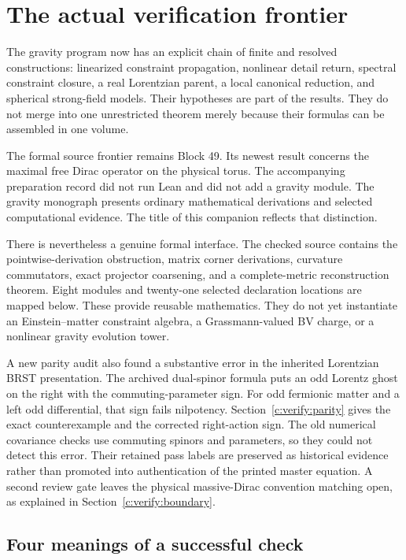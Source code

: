 \section{The actual verification frontier}\label{c:verify:frontier}

The gravity program now has an explicit chain of finite and resolved constructions: linearized constraint propagation, nonlinear detail return, spectral constraint closure, a real Lorentzian parent, a local canonical reduction, and spherical strong-field models. Their hypotheses are part of the results. They do not merge into one unrestricted theorem merely because their formulas can be assembled in one volume.

The formal source frontier remains Block 49. Its newest result concerns the maximal free Dirac operator on the physical torus. The accompanying preparation record did not run Lean and did not add a gravity module. The gravity monograph presents ordinary mathematical derivations and selected computational evidence. The title of this companion reflects that distinction.

There is nevertheless a genuine formal interface. The checked source contains the pointwise-derivation obstruction, matrix corner derivations, curvature commutators, exact projector coarsening, and a complete-metric reconstruction theorem. Eight modules and twenty-one selected declaration locations are mapped below. These provide reusable mathematics. They do not yet instantiate an Einstein--matter constraint algebra, a Grassmann-valued BV charge, or a nonlinear gravity evolution tower.

A new parity audit also found a substantive error in the inherited Lorentzian BRST presentation. The archived dual-spinor formula puts an odd Lorentz ghost on the right with the commuting-parameter sign. For odd fermionic matter and a left odd differential, that sign fails nilpotency. Section~\ref{c:verify:parity} gives the exact counterexample and the corrected right-action sign. The old numerical covariance checks use commuting spinors and parameters, so they could not detect this error. Their retained pass labels are preserved as historical evidence rather than promoted into authentication of the printed master equation. A second review gate leaves the physical massive-Dirac convention matching open, as explained in Section~\ref{c:verify:boundary}.

\subsection{Four meanings of a successful check}

